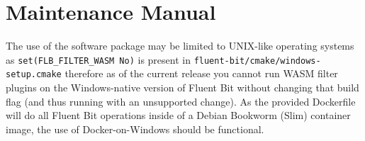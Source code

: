 \chapter{Maintenance Manual\label{chap:maintenance_man}}



The use of the software package may be limited to UNIX-like operating systems as \newline\texttt{set(FLB\_FILTER\_WASM           No)} is present in \texttt{fluent-bit/cmake/windows-setup.cmake} therefore as of the current release you cannot run WASM filter plugins on the Windows-native version of Fluent Bit without changing that build flag (and thus running with an unsupported change). As the provided Dockerfile will do all Fluent Bit operations inside of a Debian Bookworm (Slim) container image, the use of Docker-on-Windows should be functional.

